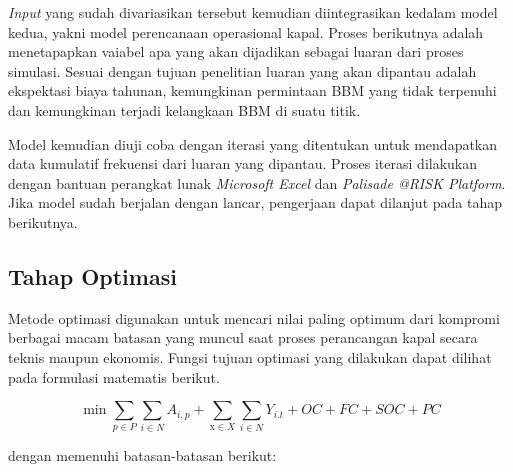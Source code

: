     \emph{Input} yang sudah divariasikan tersebut kemudian diintegrasikan kedalam model kedua, yakni model perencanaan operasional kapal. Proses berikutnya adalah menetapapkan vaiabel apa yang akan dijadikan sebagai luaran dari proses simulasi. Sesuai dengan tujuan penelitian luaran yang akan dipantau adalah ekspektasi biaya tahunan, kemungkinan permintaan BBM yang tidak terpenuhi dan kemungkinan terjadi kelangkaan BBM di suatu titik.

    Model kemudian diuji coba dengan iterasi yang ditentukan untuk mendapatkan data kumulatif frekuensi dari luaran yang dipantau. Proses iterasi dilakukan dengan bantuan perangkat lunak \emph{Microsoft Excel} dan \emph{Palisade @RISK Platform}. Jika model sudah berjalan dengan lancar, pengerjaan dapat dilanjut pada tahap berikutnya.

\subsection{Tahap Optimasi}
\label{subsec:tahap-optimasi}

    Metode optimasi digunakan untuk mencari nilai paling optimum dari kompromi berbagai macam batasan yang muncul saat proses perancangan kapal secara teknis maupun ekonomis. Fungsi tujuan optimasi yang dilakukan dapat dilihat pada formulasi matematis berikut.

    \begin{equation}
        \min\sum_{p\in P}\sum_{i\in N}A_{i,p}+\sum_{\mathrm{x}\in X}\sum_{i\in N}Y_{i.t}+OC+FC+SOC+PC
        \label{model-matematis-optimasi}
    \end{equation}

     dengan memenuhi batasan-batasan berikut:


